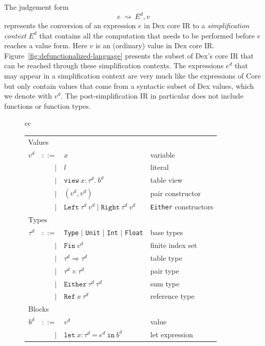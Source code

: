 \documentclass[acmsmall,screen,nonacm]{acmart}
\newcommand{\ttt}[1]{\texttt{#1}}
\newcommand{\fin}[1]{\ttt{Fin}~{#1}}
\newcommand{\defunc}{~\rightsquigarrow~}
\newcommand{\letx}[3]{\ttt{let}~#1~\ttt{=}~#2~\ttt{in}~#3}
\newcommand{\view}[3]{\ttt{view}~#1\!:\!#2 .~ #3}
\newcommand{\ann}{\!:\!}
\begin{document}
The judgement form
\[  e \defunc E^d, v \]
represents the conversion of an expression $e$ in Dex core IR to a {\em simplification context} $E^d$
that contains all the computation that needs to be performed before $e$ reaches a value form.
Here $v$ is an (ordinary) value in Dex core IR. Figure~\ref{fig:defunctionalized-language} presents
the subset of Dex's core IR that can be reached through these simplification contexts.
The expressions $e^d$ that may appear in a simplification context
are very much like the expressions of Core but only contain values that come from a syntactic
subset of Dex values, which we denote with $v^d$. The post-simplification IR in particular
does not include functions or function types.


\begin{figure}[t]\scriptsize
\begin{tabular}{cc}
\begin{tabular}{r@{~~}r@{~~}ll}
  \multicolumn{3}{l}{Values} \\
  $v^d$ & $::=$ & $x$ & variable \\
  & $\mid$ & $l$               & literal \\
  & $\mid$ & $\view x {\tau^d} b^d$  & table view \\
  & $\mid$ & $(v^d,v^d)$  & pair constructor \\
  & $\mid$ & $\ttt{Left}~\tau^d~v^d \mid \ttt{Right}~\tau^d~v^d$
              & \ttt{Either} constructors \\
  \multicolumn{3}{l}{Types} \\
  $\tau^d$ & $::=$ &
  \ttt{Type} $\mid$ \ttt{Unit} $\mid$ \ttt{Int} $\mid$ \ttt{Float} & base types \\
  & $\mid$ & $\fin v^d$   & finite index set \\
  & $\mid$ & $\tau^d \Rightarrow \tau^d $   & table type \\
  & $\mid$ & $\tau^d \times \tau^d$         & pair type \\
  & $\mid$ & $\ttt{Either}~\tau^d~\tau^d$   & sum type \\
  & $\mid$ & $\ttt{Ref}~x~\tau^d$   & reference type \\
  \multicolumn{3}{l}{Blocks} \\
  $b^d$ & $::=$
           & $v^d$ & value \\
  & $\mid$ & $\letx {x\ann\tau^d} {e^d} {b^d}$ & let expression \\
\end{tabular}%

\end{tabular}
\end{figure}
\end{document}
